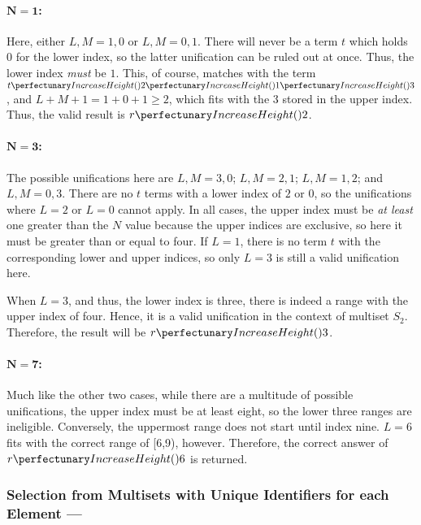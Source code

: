 \paragraph{\(\mathbf{N = 1}\):}  Here, either \(L,M = 1,0\) or \(L,M = 0,1\).  There will never be a term \(t\) which holds \(0\) for the lower index, so the latter unification can be ruled out at once.  Thus, the lower index \emph{must} be \(1\).  This, of course, matches with the term \(\cpfuncnn{t}{2}{1}{3}\), and \(L + M + 1 = 1 + 0 + 1 \geq 2\), which fits with the \(3\) stored in the upper index.  Thus, the valid result is \(\cpfunc{r}{2}\).

\paragraph{\(\mathbf{N = 3}\):}  The possible unifications here are \(L,M = 3,0\); \(L,M = 2,1\); \(L,M = 1,2\); and \(L,M = 0,3\).  There are no \(t\) terms with a lower index of \(2\) or \(0\), so the unifications where \(L = 2\) or \(L = 0\) cannot apply.  In all cases, the upper index must be \emph{at least} one greater than the \(N\) value because the upper indices are exclusive, so here it must be greater than or equal to four.  If \(L = 1\), there is no term \(t\) with the corresponding lower and upper indices, so only \(L = 3\) is still a valid unification here.

When \(L = 3\), and thus, the lower index is three, there is indeed a range with the upper index of four.   Hence, it is a valid unification in the context of multiset \(S_2\).  Therefore, the result will be \(\cpfunc{r}{3}\).

\paragraph{\(\mathbf{N = 7}\):}  Much like the other two cases, while there are a multitude of possible unifications, the upper index must be at least eight, so the lower three ranges are ineligible.  Conversely, the uppermost range does not start until index nine.  \(L = 6\) fits with the correct range of [6,9), however.  Therefore, the correct answer of \(\cpfunc{r}{6}\) is returned.

\subsubsection{Selection from Multisets with Unique Identifiers for each Element --- }\label{sec:median:selectmultisetid}

